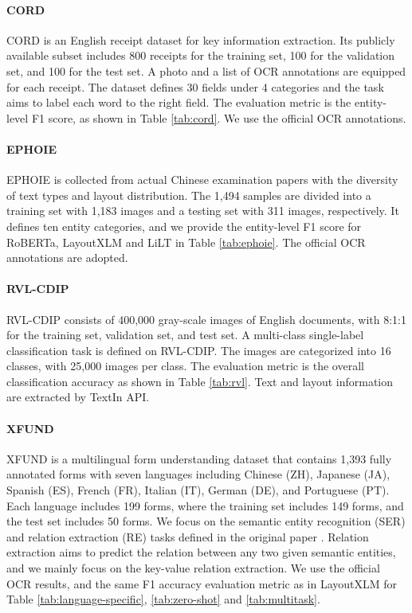 \documentclass[11pt]{article}
\begin{document}
\paragraph{CORD} CORD \cite{park2019cord} is an English receipt dataset for key information extraction. Its publicly available subset  includes 800 receipts for the training set, 100 for the validation set, and 100 for the test set. A photo and a list of OCR annotations are equipped for each receipt. 
The dataset defines 30 fields under 4 categories and the task aims to label each word to the right field. The evaluation metric is the entity-level F1 score, as shown in Table \ref{tab:cord}. We use the official OCR annotations.

\paragraph{EPHOIE} EPHOIE \cite{vies} is collected from actual Chinese examination papers with the diversity of text types and layout distribution. The 1,494 samples are divided into a training set with 1,183 images and a testing set with 311 images, respectively. 
It defines ten entity categories, and we provide the entity-level F1  score for RoBERTa, LayoutXLM and LiLT in Table \ref{tab:ephoie}.  The official OCR annotations are adopted.

\paragraph{RVL-CDIP} RVL-CDIP \cite{rvl} consists of 400,000 gray-scale images of English documents, with 8:1:1 for the training set, validation set, and test set. A multi-class single-label classification task is defined on RVL-CDIP. The images are categorized into 16 classes, with 25,000 images per class. The evaluation metric is the overall classification accuracy as shown in Table \ref{tab:rvl}. Text and layout information are extracted by TextIn API.

\paragraph{XFUND} XFUND \cite{xu2021layoutxlm} is a multilingual form understanding dataset that contains 1,393 fully annotated forms with seven languages including Chinese (ZH), Japanese (JA), Spanish (ES), French (FR), Italian (IT), German (DE), and Portuguese (PT). Each language
includes 199 forms, where the training set includes
149 forms, and the test set includes 50 forms. We focus on the semantic entity recognition (SER) and relation extraction (RE) tasks defined in the original paper \cite{xu2021layoutxlm}. Relation extraction aims to predict the relation between any two given semantic entities, and we mainly focus on the key-value relation extraction. We use the official OCR results, and the same F1 accuracy  evaluation metric as in LayoutXLM  \cite{xu2021layoutxlm} for Table \ref{tab:language-specific}, \ref{tab:zero-shot} and \ref{tab:multitask}.
\end{document}
